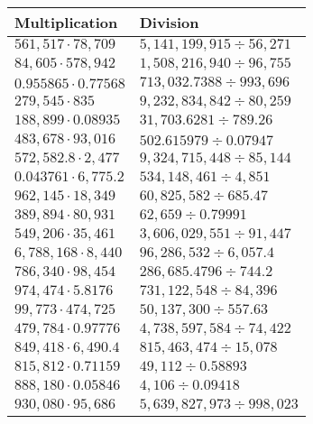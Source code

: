 \begin{longtable}[]{@{}ll@{}}
\toprule
Multiplication & Division\tabularnewline
\midrule
\endhead
\(561,517\cdot78,709\) & \(5,141,199,915÷56,271\)\tabularnewline
\(84,605\cdot578,942\) & \(1,508,216,940÷96,755\)\tabularnewline
\(0.955865\cdot0.77568\) & \(713,032.7388 ÷993,696\)\tabularnewline
\(279,545\cdot835\) & \(9,232,834,842÷80,259\)\tabularnewline
\(188,899\cdot0.08935\) & \(31,703.6281÷789.26\)\tabularnewline
\(483,678\cdot93,016\) & \(502.615979÷0.07947\)\tabularnewline
\(572,582.8\cdot2,477\) & \(9,324,715,448÷85,144\)\tabularnewline
\(0.043761\cdot6,775.2\) & \(534,148,461÷4,851\)\tabularnewline
\(962,145\cdot18,349\) & \(60,825,582÷685.47\)\tabularnewline
\(389,894\cdot80,931\) & \(62,659÷0.79991\)\tabularnewline
\(549,206\cdot35,461\) & \(3,606,029,551÷91,447\)\tabularnewline
\(6,788,168\cdot8,440\) & \(96,286,532÷6,057.4\)\tabularnewline
\(786,340\cdot98,454\) & \(286,685.4796÷744.2\)\tabularnewline
\(974,474\cdot5.8176\) & \(731,122,548÷84,396\)\tabularnewline
\(99,773\cdot474,725\) & \(50,137,300÷557.63\)\tabularnewline
\(479,784\cdot0.97776\) & \(4,738,597,584÷74,422\)\tabularnewline
\(849,418\cdot6,490.4\) & \(815,463,474÷15,078\)\tabularnewline
\(815,812\cdot0.71159\) & \(49,112÷0.58893\)\tabularnewline
\(888,180\cdot0.05846\) & \(4,106÷0.09418\)\tabularnewline
\(930,080\cdot95,686\) & \(5,639,827,973÷998,023\)\tabularnewline
\bottomrule
\end{longtable}
